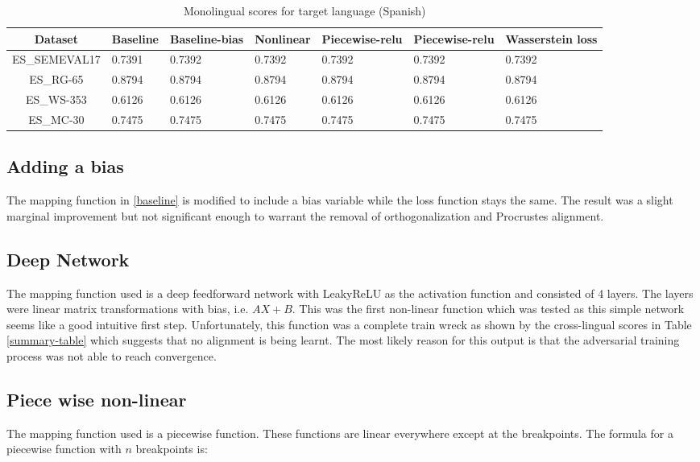\documentclass[11pt]{article}
\begin{document}
\begin{table*}[ht]
  \begin{center}
  \begin{tabular}{|c|l|l|l|l|l|l|}
  \hline
  Dataset & Baseline & Baseline-bias & Nonlinear & Piecewise-relu & Piecewise-relu & Wasserstein loss\\
  \hline
  ES\_SEMEVAL17 & 0.7391 & 0.7392 & 0.7392 & 0.7392 & 0.7392 & 0.7392 \\
  \hline
  ES\_RG-65 & 0.8794 & 0.8794 & 0.8794 & 0.8794 & 0.8794 & 0.8794 \\
  \hline
  ES\_WS-353 & 0.6126 & 0.6126 & 0.6126 & 0.6126 & 0.6126 & 0.6126 \\
  \hline
  ES\_MC-30 & 0.7475 & 0.7475 & 0.7475 & 0.7475 & 0.7475 & 0.7475 \\
  \hline
  \end{tabular}
  \end{center}
  \caption{ Monolingual scores for target language (Spanish)}
  \label{monolingual-target}
\end{table*}

\subsection{Adding a bias}
The mapping function in \ref{baseline} is modified to include a bias variable while the loss function stays the same. The result was a slight marginal improvement but not significant enough to warrant the removal of orthogonalization and Procrustes alignment.

\subsection{Deep Network}
The mapping function used is a deep feedforward network with LeakyReLU as the activation function and consisted of 4 layers. The layers were linear matrix transformations with bias, i.e. $AX + B$. This was the first non-linear function which was tested as this simple network seems like a good intuitive first step. Unfortunately, this function was a complete train wreck as shown by the cross-lingual scores in Table \ref{summary-table} which suggests that no alignment is being learnt. The most likely reason for this output is that the adversarial training process was not able to reach convergence.

\subsection{Piece wise non-linear}
The mapping function used is a piecewise function. These functions are linear everywhere except at the breakpoints. The formula for a piecewise function with $n$ breakpoints is:
\end{document}
